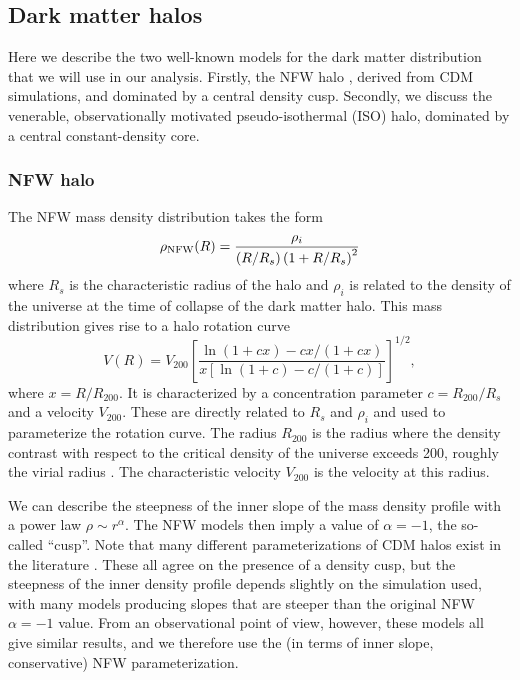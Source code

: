 \documentclass[usenatbib,usegraphicx,apjfonts,floatfix]{emulateapj}
\begin{document}
\subsection{Dark matter halos\label{sect:dmhalos}}

Here we describe the two well-known models for the dark matter
distribution that we will use in our analysis.  Firstly, the NFW halo
\citep{NFW96,NFW97}, derived from CDM simulations, and dominated by a
central density cusp. Secondly, we discuss the venerable,
observationally motivated pseudo-isothermal (ISO) halo, dominated by a
central constant-density core.

\subsubsection{NFW halo}

The NFW mass density distribution takes the form
\begin{equation}
\rho_{\rm NFW}(R) = \frac{\rho_i}{\left(R/R_s\right)
\left(1+ R/R_s\right)^2}
\end{equation}   
where $R_s$ is the characteristic radius of the halo and
$\rho_i$ is related to the density of the universe at the time of collapse of the dark matter halo.
This mass distribution gives rise to a halo rotation curve  
\begin{equation}
V(R) = V_{200} \left[\frac{\ln(1+cx)-cx/(1+cx)}
{x[\ln(1+c)-c/(1+c)]}\right]^{1/2},
\end{equation}  
where $x = R/R_{200}$.  It is characterized by a concentration
parameter $c = R_{200}/R_s$ and a velocity $V_{200}$. These are directly
related to $R_s$ and $\rho_i$ and used to
parameterize the rotation curve.  The radius $R_{200}$ is the radius
where the density contrast with respect to the critical density of the
universe exceeds 200, roughly the virial radius \citep{NFW96}. The
characteristic velocity $V_{200}$ is the velocity at this radius.  

We can describe the steepness of the inner slope of the mass density
profile with a power law $\rho \sim r^{\alpha}$. The NFW models then
imply a value of $\alpha=-1$, the so-called ``cusp''.  Note that many
different parameterizations of CDM halos exist in the literature
\citep[e.g.,][]{NFW96,NFW97,moore99b,navarro04,diemand2005}.  These
all agree on the presence of a density cusp, but the steepness of the
inner density profile depends slightly on the simulation used, with
many models producing slopes that are steeper than the original NFW
$\alpha=-1$ value.  From an observational point of view, however,
these models all give similar results, and we therefore use the (in
terms of inner slope, conservative) NFW parameterization.
\end{document}

